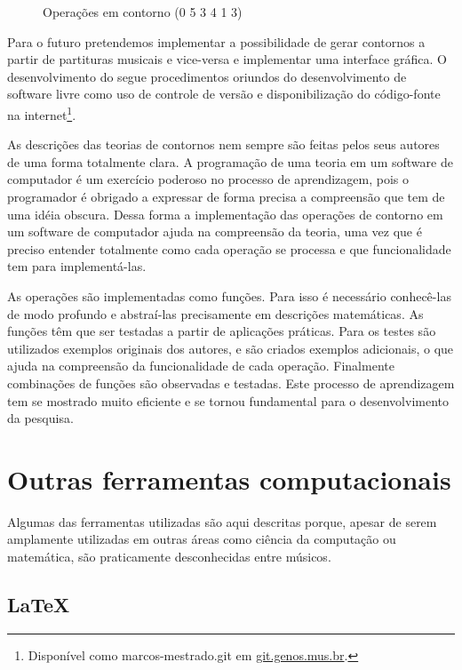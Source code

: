 \begin{figure}
  \centering
  \caption{Operações em contorno (0 5 3 4 1 3)}
  \label{fig:operacoes}
\end{figure}
Para o futuro pretendemos implementar a possibilidade de gerar
contornos a partir de partituras musicais e vice-versa e implementar
uma interface gráfica. O desenvolvimento do \goiaba{} segue
procedimentos oriundos do desenvolvimento de software livre como uso
de controle de versão e disponibilização do código-fonte na
internet\footnote{Disponível como marcos-mestrado.git em
  \url{git.genos.mus.br}.}.

As descrições das teorias de contornos nem sempre são feitas pelos
seus autores de uma forma totalmente clara. A programação de uma
teoria em um software de computador é um exercício poderoso no
processo de aprendizagem, pois o programador é obrigado a expressar de
forma precisa a compreensão que tem de uma idéia obscura. Dessa forma
a implementação das operações de contorno em um software de computador
ajuda na compreensão da teoria, uma vez que é preciso entender
totalmente como cada operação se processa e que funcionalidade tem
para implementá-las.

As operações são implementadas como funções. Para isso é necessário
conhecê-las de modo profundo e abstraí-las precisamente em descrições
matemáticas. As funções têm que ser testadas a partir de aplicações
práticas. Para os testes são utilizados exemplos originais dos
autores, e são criados exemplos adicionais, o que ajuda na compreensão
da funcionalidade de cada operação. Finalmente combinações de funções
são observadas e testadas. Este processo de aprendizagem tem se
mostrado muito eficiente e se tornou fundamental para o
desenvolvimento da pesquisa.

\section{Outras ferramentas computacionais}
\label{sec:outr-ferr-comp}

Algumas das ferramentas utilizadas são aqui descritas porque, apesar
de serem amplamente utilizadas em outras áreas como ciência da
computação ou matemática, são praticamente desconhecidas entre
músicos.

\subsection{\LaTeX{}}
\label{sec:latex}

